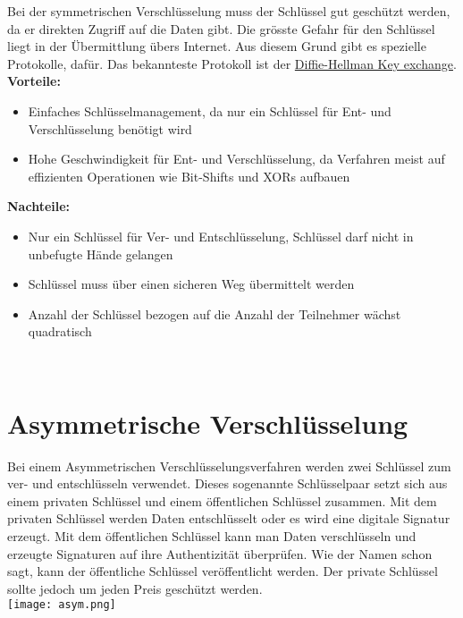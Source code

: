 \documentclass{article}
\begin{document}
Bei der symmetrischen Verschlüsselung muss der Schlüssel gut geschützt werden, da er direkten Zugriff auf die Daten gibt. Die grösste Gefahr für den Schlüssel liegt in der Übermittlung übers Internet. Aus diesem Grund gibt es spezielle Protokolle, dafür. Das bekannteste Protokoll ist der \href{https://www.youtube.com/watch?v=NmM9HA2MQGI}{Diffie-Hellman Key exchange}. \\


\textbf{Vorteile:}
\begin{itemize}
    \item Einfaches Schlüsselmanagement, da nur ein Schlüssel für Ent- und Verschlüsselung benötigt wird
    \item Hohe Geschwindigkeit für Ent- und Verschlüsselung, da Verfahren meist auf effizienten Operationen wie Bit-Shifts und XORs aufbauen
\end{itemize}

\textbf{Nachteile:}
\begin{itemize}
    \item Nur ein Schlüssel für Ver- und Entschlüsselung, Schlüssel darf nicht in unbefugte Hände gelangen
    \item Schlüssel muss über einen sicheren Weg übermittelt werden
    \item Anzahl der Schlüssel bezogen auf die Anzahl der Teilnehmer wächst quadratisch
\end{itemize}\cite{1} \\

\section*{Asymmetrische Verschlüsselung}

Bei einem Asymmetrischen Verschlüsselungsverfahren werden zwei Schlüssel  zum ver- und entschlüsseln verwendet. Dieses sogenannte Schlüsselpaar setzt sich aus einem privaten Schlüssel und einem öffentlichen Schlüssel zusammen. Mit dem privaten Schlüssel werden Daten entschlüsselt oder es wird eine digitale Signatur erzeugt. Mit dem öffentlichen Schlüssel kann man Daten verschlüsseln und erzeugte Signaturen auf ihre Authentizität überprüfen. Wie der Namen schon sagt, kann der öffentliche Schlüssel veröffentlicht werden. Der private Schlüssel sollte jedoch um jeden Preis geschützt werden. \\

\texttt{[image: asym.png]} \\
\cite{4} \\\\
\end{document}
